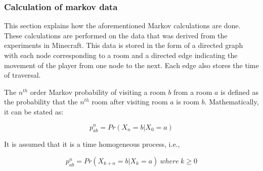 \subsubsection{Calculation of markov data} %
\label{sec:calculation_of_markov_data}


This section explains how the aforementioned Markov calculations are done. These calculations are performed on the data that was derived from the experiments in Minecraft. This data is stored in the form of a directed graph with each node corresponding to a room and a directed edge indicating the movement of the player from one node to the next. Each edge also stores the time of traversal.


The $n^{th}$ order Markov probability of visiting a room $b$ from a room $a$ is defined as the probability that the $n^{th}$ room after visiting room $a$ is room $b$. Mathematically, it can be stated as:

\begin{equation}
    p^{n}_{ab} = Pr(X_{n}=b|X_{0}=a)
\end{equation}

It is assumed that it is a time homogeneous process, i.e.,

\begin{equation}
    p^{n}_{ab} = Pr(X_{k+n}=b|X_{k}=a) \ where\  k \geq 0
\end{equation}



